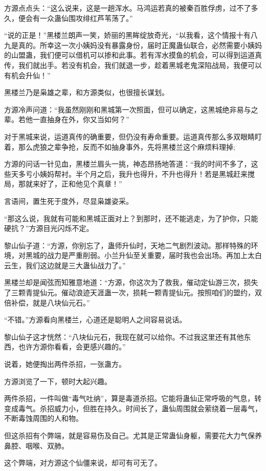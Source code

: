 \begin{this_body}
方源点点头：“这么说来，这是一趟浑水。马鸿运若真的被秦百胜俘虏，过不了多久，便会有一众蛊仙围攻绯红芦苇荡了。”

“说的正是！”黑楼兰朗声一笑，娇丽的黑眸绽放奇光，“以我看，这个情报十有八九是真的。所幸这一次小姨妈没有暴露身份，届时正魔蛊仙联合，必然需要小姨妈的山盟蛊，我们便可以借机可以掺和此事。若有浑水摸鱼的机会，可以得到运道真传，我们就出手。若没有机会，我们就退一步，趁着黑城老鬼深陷战局，我便可以有机会升仙！”

黑楼兰乃是枭雄之辈，和方源类似，也很擅长谋划。

方源冷声问道：“我虽然刚刚和黑城第一次照面，但可以确定，这黑城绝非易与之辈。若他一直抽身在外，你又当如何？”

对于黑城来说，运道真传的确重要，但仍没有寿命重要。运道真传那么多双眼睛盯着，那么虎狼之辈争抢，反而不如抽身事外，先将黑楼兰这个麻烦料理掉;

方源的问话一针见血，黑楼兰眉头一挑，神态昂扬地答道：“我的时间不多了，这些天多亏小姨妈帮衬。半个月之后，我升也得升，不升也得升！若是黑城赶来搅局，那就来好了，正和他见个真章！”

言语间，置生死于度外，尽显枭雄姿采。

“那这么说，我就有可能和黑城正面对上？到那时，还不能逃走，为了护你，只能硬抗？”方源目光闪烁不定。

黎山仙子道：“方源，你别忘了，蛊师升仙时，天地二气剧烈波动。那样特殊的环境，对黑城的战力是严重削弱。小兰升仙至关重要，届时我也会出场。再加上太白云生，我们这边就是三大蛊仙战力了。”

黑楼兰却是闻弦而知雅意地道：“方源，你这次为了救我，催动定仙游三次，损失了三颗青提仙元。催动浪迹天涯蛊一次，损耗一颗青提仙元。按照咱们的盟约，双倍补偿，就是八块仙元石。”

“不错。”方源看向黑楼兰，心道还是聪明人之间容易说话。

黎山仙子这才恍然：“八块仙元石，我现在就可以给你。不过我这里还有其他东西，也许方源你看看，会更感兴趣的。”

说着，她便掏出两件杀招，一张蛊方。

方源浏览了一下，顿时大起兴趣。

两件杀招，一件叫做“毒气吐纳”，算是毒道杀招。它能将蛊仙正常呼吸的气息，转变成毒气。杀招威力小，但胜在持久。时间长了，蛊仙周围就会萦绕着一层毒气，不断毒蚀周围的人和物。

但这杀招有个弊端，就是容易伤及自己。尤其是正常蛊仙身躯，需要花大力气保养鼻腔、咽喉、双肺。

这个弊端，对方源这个仙僵来说，却可有可无了。


\end{this_body}
